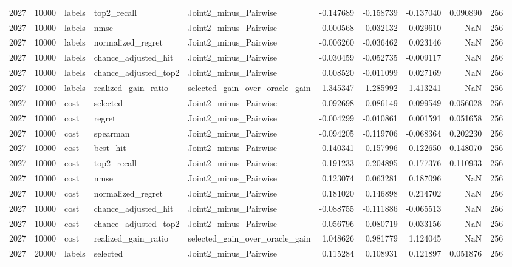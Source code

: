 \begin{tabular}{rrlllrrrrr}
2027 & 10000 & labels & top2_recall & Joint2_minus_Pairwise & -0.147689 & -0.158739 & -0.137040 & 0.090890 & 256 \\
2027 & 10000 & labels & nmse & Joint2_minus_Pairwise & -0.000568 & -0.032132 & 0.029610 & NaN & 256 \\
2027 & 10000 & labels & normalized_regret & Joint2_minus_Pairwise & -0.006260 & -0.036462 & 0.023146 & NaN & 256 \\
2027 & 10000 & labels & chance_adjusted_hit & Joint2_minus_Pairwise & -0.030459 & -0.052735 & -0.009117 & NaN & 256 \\
2027 & 10000 & labels & chance_adjusted_top2 & Joint2_minus_Pairwise & 0.008520 & -0.011099 & 0.027169 & NaN & 256 \\
2027 & 10000 & labels & realized_gain_ratio & selected_gain_over_oracle_gain & 1.345347 & 1.285992 & 1.413241 & NaN & 256 \\
2027 & 10000 & cost & selected & Joint2_minus_Pairwise & 0.092698 & 0.086149 & 0.099549 & 0.056028 & 256 \\
2027 & 10000 & cost & regret & Joint2_minus_Pairwise & -0.004299 & -0.010861 & 0.001591 & 0.051658 & 256 \\
2027 & 10000 & cost & spearman & Joint2_minus_Pairwise & -0.094205 & -0.119706 & -0.068364 & 0.202230 & 256 \\
2027 & 10000 & cost & best_hit & Joint2_minus_Pairwise & -0.140341 & -0.157996 & -0.122650 & 0.148070 & 256 \\
2027 & 10000 & cost & top2_recall & Joint2_minus_Pairwise & -0.191233 & -0.204895 & -0.177376 & 0.110933 & 256 \\
2027 & 10000 & cost & nmse & Joint2_minus_Pairwise & 0.123074 & 0.063281 & 0.187096 & NaN & 256 \\
2027 & 10000 & cost & normalized_regret & Joint2_minus_Pairwise & 0.181020 & 0.146898 & 0.214702 & NaN & 256 \\
2027 & 10000 & cost & chance_adjusted_hit & Joint2_minus_Pairwise & -0.088755 & -0.111886 & -0.065513 & NaN & 256 \\
2027 & 10000 & cost & chance_adjusted_top2 & Joint2_minus_Pairwise & -0.056796 & -0.080719 & -0.033156 & NaN & 256 \\
2027 & 10000 & cost & realized_gain_ratio & selected_gain_over_oracle_gain & 1.048626 & 0.981779 & 1.124045 & NaN & 256 \\
2027 & 20000 & labels & selected & Joint2_minus_Pairwise & 0.115284 & 0.108931 & 0.121897 & 0.051876 & 256 \\

\end{tabular}
